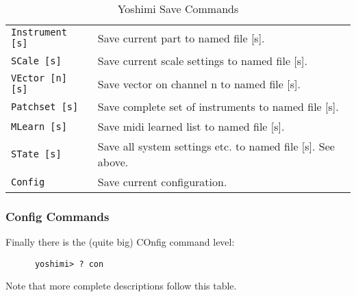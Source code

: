    \begin{table}[H]
      \centering
      \caption{Yoshimi Save Commands}
      \label{table:yoshimi_text_loadsave_commands}
      \begin{tabular}{l l}

\texttt{Instrument [s]} &
   Save current part to named file [s]. \\
\texttt{SCale [s]} &
   Save current scale settings to named file [s]. \\
\texttt{VEctor [n] [s]} &
   Save vector on channel n to named file [s]. \\
\texttt{Patchset [s]} &
   Save complete set of instruments to named file [s]. \\
\texttt{MLearn [s]} &
   Save midi learned list to named file [s]. \\
\texttt{STate [s]} &
   Save all system settings etc. to named file [s].  See above. \\
\texttt{Config} &
   Save current configuration. \\

      \end{tabular}
   \end{table}

\subsubsection{Config Commands}
\label{subsec:command_line_config_list}

   Finally there is the (quite big) COnfig command level:

   \begin{verbatim}
      yoshimi> ? con
   \end{verbatim}

   Note that more complete descriptions follow this table.

